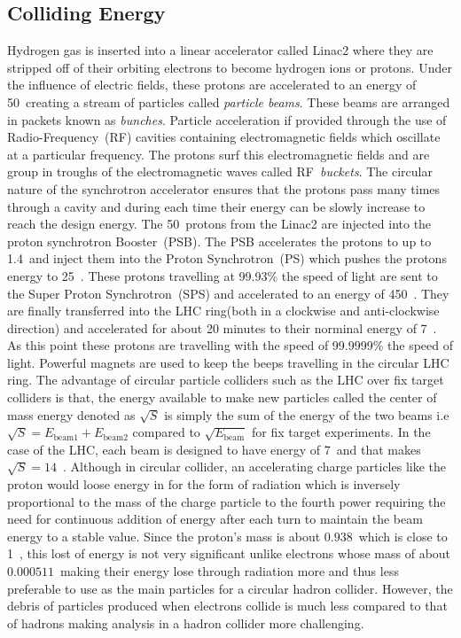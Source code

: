 \subsection{Colliding Energy}
Hydrogen gas is inserted into a linear accelerator called Linac2 where they are stripped off of their orbiting electrons to become hydrogen ions or protons. Under the influence of electric fields, these protons are accelerated to an energy of 50~\MeV creating a stream of particles called \textit{particle beams}. These beams are arranged in packets known as \textit{bunches}. Particle acceleration if provided through the use of Radio-Frequency~(RF) cavities containing electromagnetic fields which oscillate at a particular frequency. The protons surf this electromagnetic fields and are group in troughs of the electromagnetic waves called RF~\textit{buckets}. The circular nature of the synchrotron accelerator ensures that the protons pass many times through a cavity and during each time their energy can be slowly increase to reach the design energy.
The 50~\MeV protons from the Linac2 are injected into the proton synchrotron Booster~(PSB). The PSB accelerates the protons to up to 1.4~\GeV and inject them into the Proton Synchrotron~(PS) which pushes the protons energy to 25~\GeV. These protons travelling at 99.93\% the speed of light are sent to the Super Proton Synchrotron~(SPS) and accelerated to an energy of 450~\GeV. They are finally transferred into the LHC ring(both in a clockwise and anti-clockwise direction) and accelerated for about 20 minutes to their norminal energy of 7~\TeV. As this point these protons are travelling with the speed of 99.9999\% the speed of light. Powerful magnets are used to keep the beeps travelling in the circular LHC ring. The advantage of circular particle colliders such as the LHC over fix target colliders is that, the energy available to make new particles called the center of mass energy denoted as $\sqrt{S}$ is simply the sum of the energy of the two beams i.e $\sqrt{S} = \mathit{E}_{\mbox{beam1}} +   \mathit{E}_{\mbox{beam2}}$ compared to $\sqrt{\mathit{E}_{\mbox{beam}}}$ for fix target experiments. In the case of the LHC, each beam is designed to have energy of 7~\TeV and that makes $\sqrt{S} = 14$~\TeV. Although in circular collider, an accelerating charge particles like the proton would loose energy in for the form of radiation which is inversely proportional to the mass of the charge particle to the fourth power requiring  the need for continuous addition of energy after each turn to maintain the beam energy to a stable value. Since the proton's mass is  about $0.938$~\GeV which is close to 1~\GeV, this lost of energy is not very significant unlike  electrons  whose mass of about $0.000511$~\GeV making their energy lose through radiation more and thus less preferable to use as the main particles for a circular hadron collider. However, the debris of particles produced when electrons collide is much less compared to that of hadrons making analysis in a hadron collider more challenging. 
